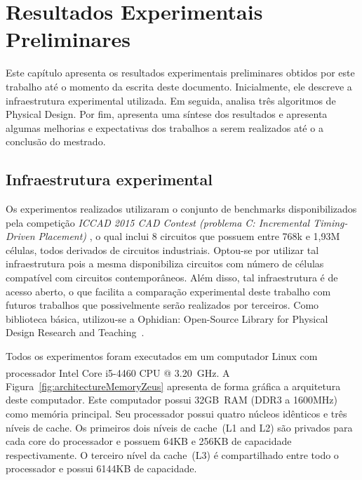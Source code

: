 \chapter{Resultados Experimentais Preliminares}
\label{cap:resultados}

Este capítulo apresenta os resultados experimentais preliminares obtidos por este trabalho até o momento da escrita deste documento. Inicialmente, ele descreve a infraestrutura experimental utilizada. Em seguida, analisa três algoritmos de Physical Design. Por fim, apresenta uma síntese dos resultados e apresenta algumas melhorias e expectativas dos trabalhos a serem realizados até o a conclusão do mestrado.

\section{Infraestrutura experimental}
\label{sec:infraestrutura_experimental}

Os experimentos realizados utilizaram o conjunto de benchmarks disponibilizados pela competição \textit{ICCAD 2015 CAD Contest (problema C: Incremental Timing-Driven Placement)} \cite{kim2015}, o qual inclui 8 circuitos que possuem entre 768k e 1,93M células, todos derivados de circuitos industriais. Optou-se por utilizar tal infraestrutura pois a mesma disponibiliza circuitos com número de células compatível com circuitos contemporâneos. Além disso, tal infraestrutura é de acesso aberto, o que facilita a comparação experimental deste trabalho com futuros trabalhos que possivelmente serão realizados por terceiros. Como biblioteca básica, utilizou-se a Ophidian: Open-Source Library for Physical Design Research and Teaching~\cite{ophidian}.

Todos os experimentos foram executados em um computador Linux com processador Intel\textsuperscript{\textregistered} Core\textsuperscript{\textregistered} i5-4460 CPU @ 3.20~GHz.
A Figura~\ref{fig:architectureMemoryZeus} apresenta de forma gráfica a arquitetura deste computador.
Este computador possui 32GB~RAM (DDR3 a 1600MHz) como memória principal.
Seu processador possui quatro núcleos idênticos e três níveis de cache.
Os primeiros dois níveis de cache~(L1 and L2) são privados para cada core do processador e possuem 64KB e 256KB de capacidade respectivamente.
O terceiro nível da cache~(L3) é compartilhado entre todo o processador e possui 6144KB de capacidade.

